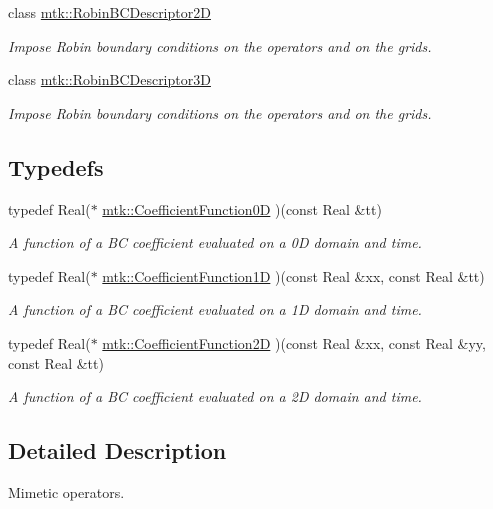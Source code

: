 \begin{DoxyCompactItemize}
class \hyperlink{classmtk_1_1RobinBCDescriptor2D}{mtk\+::\+Robin\+B\+C\+Descriptor2\+D}
\begin{DoxyCompactList}\small\item\em Impose Robin boundary conditions on the operators and on the grids. \end{DoxyCompactList}\item 
class \hyperlink{classmtk_1_1RobinBCDescriptor3D}{mtk\+::\+Robin\+B\+C\+Descriptor3\+D}
\begin{DoxyCompactList}\small\item\em Impose Robin boundary conditions on the operators and on the grids. \end{DoxyCompactList}\end{DoxyCompactItemize}
\subsection*{Typedefs}
\begin{DoxyCompactItemize}
\item 
typedef Real($\ast$ \hyperlink{group__c07-mim__ops_ga04276745b4d511f0f3c636d6e0df7c2d}{mtk\+::\+Coefficient\+Function0\+D} )(const Real \&tt)
\begin{DoxyCompactList}\small\item\em A function of a B\+C coefficient evaluated on a 0\+D domain and time. \end{DoxyCompactList}\item 
typedef Real($\ast$ \hyperlink{group__c07-mim__ops_gaa79593eeb6676d6011db339e01983909}{mtk\+::\+Coefficient\+Function1\+D} )(const Real \&xx, const Real \&tt)
\begin{DoxyCompactList}\small\item\em A function of a B\+C coefficient evaluated on a 1\+D domain and time. \end{DoxyCompactList}\item 
typedef Real($\ast$ \hyperlink{group__c07-mim__ops_ga0ff293d1fd754006d64a3588971dc5c4}{mtk\+::\+Coefficient\+Function2\+D} )(const Real \&xx, const Real \&yy, const Real \&tt)
\begin{DoxyCompactList}\small\item\em A function of a B\+C coefficient evaluated on a 2\+D domain and time. \end{DoxyCompactList}\end{DoxyCompactItemize}


\subsection{Detailed Description}
Mimetic operators. 

